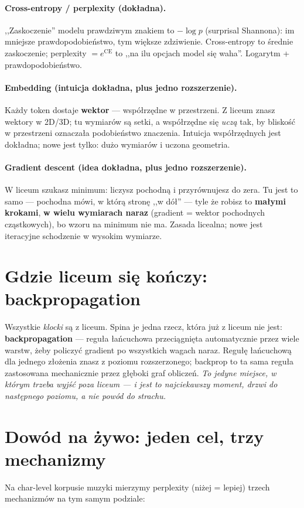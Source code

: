 \documentclass[11pt]{article}
\begin{document}
\paragraph{Cross-entropy / perplexity (dokładna).} ,,Zaskoczenie'' modelu prawdziwym znakiem to
$-\log p$ (surprisal Shannona): im mniejsze prawdopodobieństwo, tym większe zdziwienie. Cross-entropy to średnie
zaskoczenie; perplexity $=e^{\text{CE}}$ to ,,na ilu opcjach model się waha''. Logarytm + prawdopodobieństwo.

\paragraph{Embedding (intuicja dokładna, plus jedno rozszerzenie).} Każdy token dostaje \textbf{wektor}
--- współrzędne w przestrzeni. Z liceum znasz wektory w 2D/3D; tu wymiarów są setki, a współrzędne się
\emph{uczą} tak, by bliskość w przestrzeni oznaczała podobieństwo znaczenia. Intuicja współrzędnych jest
dokładna; nowe jest tylko: dużo wymiarów i uczona geometria.

\paragraph{Gradient descent (idea dokładna, plus jedno rozszerzenie).} W liceum szukasz minimum: liczysz
pochodną i przyrównujesz do zera. Tu jest to samo --- pochodna mówi, w którą stronę ,,w dół'' --- tyle że
robisz to \textbf{małymi krokami}, \textbf{w wielu wymiarach naraz} (gradient = wektor pochodnych cząstkowych),
bo wzoru na minimum nie ma. Zasada licealna; nowe jest iteracyjne schodzenie w wysokim wymiarze.

\section{Gdzie liceum się kończy: backpropagation}
Wszystkie \emph{klocki} są z liceum. Spina je jedna rzecz, która już z liceum nie jest: \textbf{backpropagation}
--- reguła łańcuchowa przeciągnięta automatycznie przez wiele warstw, żeby policzyć gradient po wszystkich wagach
naraz. Regułę łańcuchową dla jednego złożenia znasz z poziomu rozszerzonego; backprop to ta sama reguła zastosowana
mechanicznie przez głęboki graf obliczeń. \emph{To jedyne miejsce, w którym trzeba wyjść poza liceum --- i jest
to najciekawszy moment, drzwi do następnego poziomu, a nie powód do strachu.}

\section{Dowód na żywo: jeden cel, trzy mechanizmy}
Na char-level korpusie muzyki mierzymy perplexity (niżej = lepiej) trzech mechanizmów na tym samym podziale:
\end{document}
